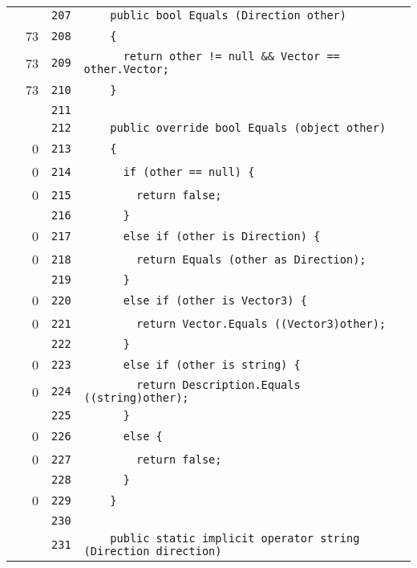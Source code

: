 \documentclass[a4paper,10pt]{article}
\begin{document}
\begin{longtable}[l]{lrrl}
\cellcolor{gray} &  & \verb~207~ & \verb~    public bool Equals (Direction other)~\\
\cellcolor{green} & 73 & \verb~208~ & \verb~    {~\\
\cellcolor{green} & 73 & \verb~209~ & \verb~      return other != null && Vector == other.Vector;~\\
\cellcolor{green} & 73 & \verb~210~ & \verb~    }~\\
\cellcolor{gray} &  & \verb~211~ & \verb~~\\
\cellcolor{gray} &  & \verb~212~ & \verb~    public override bool Equals (object other)~\\
\cellcolor{red} & 0 & \verb~213~ & \verb~    {~\\
\cellcolor{red} & 0 & \verb~214~ & \verb~      if (other == null) {~\\
\cellcolor{red} & 0 & \verb~215~ & \verb~        return false;~\\
\cellcolor{gray} &  & \verb~216~ & \verb~      }~\\
\cellcolor{red} & 0 & \verb~217~ & \verb~      else if (other is Direction) {~\\
\cellcolor{red} & 0 & \verb~218~ & \verb~        return Equals (other as Direction);~\\
\cellcolor{gray} &  & \verb~219~ & \verb~      }~\\
\cellcolor{red} & 0 & \verb~220~ & \verb~      else if (other is Vector3) {~\\
\cellcolor{red} & 0 & \verb~221~ & \verb~        return Vector.Equals ((Vector3)other);~\\
\cellcolor{gray} &  & \verb~222~ & \verb~      }~\\
\cellcolor{red} & 0 & \verb~223~ & \verb~      else if (other is string) {~\\
\cellcolor{red} & 0 & \verb~224~ & \verb~        return Description.Equals ((string)other);~\\
\cellcolor{gray} &  & \verb~225~ & \verb~      }~\\
\cellcolor{red} & 0 & \verb~226~ & \verb~      else {~\\
\cellcolor{red} & 0 & \verb~227~ & \verb~        return false;~\\
\cellcolor{gray} &  & \verb~228~ & \verb~      }~\\
\cellcolor{red} & 0 & \verb~229~ & \verb~    }~\\
\cellcolor{gray} &  & \verb~230~ & \verb~~\\
\cellcolor{gray} &  & \verb~231~ & \verb~    public static implicit operator string (Direction direction)~\\

\end{longtable}
\end{document}
